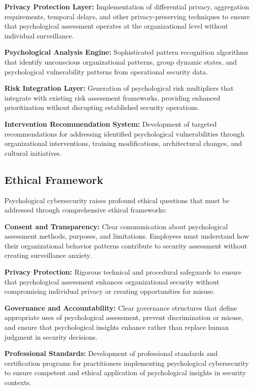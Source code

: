 \documentclass[10pt, twocolumn]{article}
\begin{document}
\textbf{Privacy Protection Layer:} Implementation of differential privacy, aggregation requirements, temporal delays, and other privacy-preserving techniques to ensure that psychological assessment operates at the organizational level without individual surveillance.

\textbf{Psychological Analysis Engine:} Sophisticated pattern recognition algorithms that identify unconscious organizational patterns, group dynamic states, and psychological vulnerability patterns from operational security data.

\textbf{Risk Integration Layer:} Generation of psychological risk multipliers that integrate with existing risk assessment frameworks, providing enhanced prioritization without disrupting established security operations.

\textbf{Intervention Recommendation System:} Development of targeted recommendations for addressing identified psychological vulnerabilities through organizational interventions, training modifications, architectural changes, and cultural initiatives.

\subsection{Ethical Framework}

Psychological cybersecurity raises profound ethical questions that must be addressed through comprehensive ethical frameworks:

\textbf{Consent and Transparency:} Clear communication about psychological assessment methods, purposes, and limitations. Employees must understand how their organizational behavior patterns contribute to security assessment without creating surveillance anxiety.

\textbf{Privacy Protection:} Rigorous technical and procedural safeguards to ensure that psychological assessment enhances organizational security without compromising individual privacy or creating opportunities for misuse.

\textbf{Governance and Accountability:} Clear governance structures that define appropriate uses of psychological assessment, prevent discrimination or misuse, and ensure that psychological insights enhance rather than replace human judgment in security decisions.

\textbf{Professional Standards:} Development of professional standards and certification programs for practitioners implementing psychological cybersecurity to ensure competent and ethical application of psychological insights in security contexts.
\end{document}
